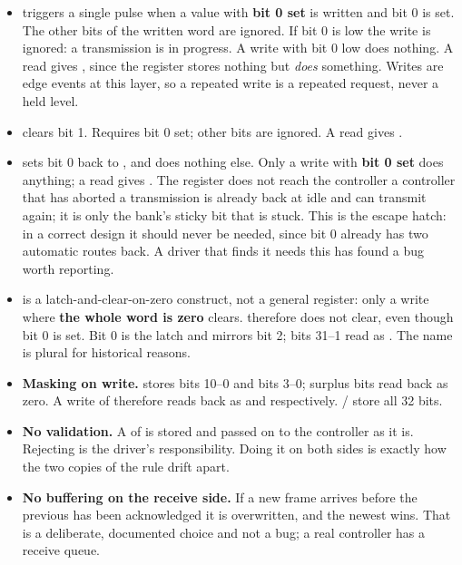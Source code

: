 \begin{itemize}
  \item \textbf{} triggers a single  pulse when a value with \textbf{bit 0
    set} is written and  bit 0 is set. The other bits of the written word are ignored.
    If  bit 0 is low the write is ignored: a transmission is in progress. A write with
    bit 0 low does nothing. A read gives , since the register stores nothing but
    \emph{does} something. Writes are edge events at this layer, so a repeated write is a repeated
    request, never a held level.
  \item \textbf{} clears  bit 1. Requires bit 0 set; other bits are
    ignored. A read gives .
  \item \textbf{} sets  bit 0 back to , and does nothing else.
    Only a write with \textbf{bit 0 set} does anything; a read gives . The register
    does not reach the controller \textemdash{} a controller that has aborted a transmission is
    already back at idle and can transmit again; it is only the bank's sticky bit that is stuck. This
    is the escape hatch: in a correct design it should never be needed, since bit 0 already has two
    automatic routes back. A driver that finds it needs this has found a bug worth reporting.
  \item \textbf{} is a latch-and-clear-on-zero construct, not a general register:
    only a write where \textbf{the whole word is zero} clears.  therefore does not
    clear, even though bit 0 is set. Bit 0 is the latch and mirrors  bit 2; bits 31--1
    read as . The name is plural for historical reasons.
  \item \textbf{Masking on write.}  stores bits 10--0 and  bits 3--0;
    surplus bits read back as zero. A write of  therefore reads back as
     and  respectively. / store all 32
    bits.
  \item \textbf{No validation.} A  of  is stored and passed on to the
    controller as it is. Rejecting  is the driver's responsibility. Doing it on both
    sides is exactly how the two copies of the rule drift apart.
  \item \textbf{No buffering on the receive side.} If a new frame arrives before the previous has
    been acknowledged it is overwritten, and the newest wins. That is a deliberate, documented choice
    and not a bug; a real controller has a receive queue.
\end{itemize}

